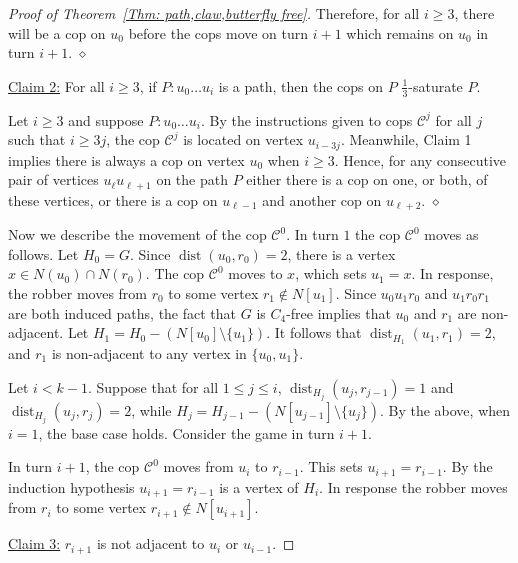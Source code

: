 \documentclass[12pt]{article}
\theoremstyle{definition}
\DeclareMathOperator{\dist}{dist}
\begin{document}
\begin{proof}[Proof of Theorem~\ref{Thm: path,claw,butterfly free}]
Therefore, for all $i\geq 3$, there will be a cop on $u_0$ before the cops move on turn $i+1$ which remains on $u_0$ in turn $i+1$.
\hfill $\diamond$
\vspace{0.5cm}


\vspace{0.25cm}
\noindent\underline{Claim 2:} For all $i\geq 3$, if $P: u_0\dots u_i$ is a path, then the cops on $P$ $\frac{1}{3}$-saturate $P$.
\vspace{0.25cm}

Let $i\geq 3$ and suppose $P: u_0\dots u_i$.
By the instructions given to cops $\mathcal{C}^j$ for all $j$ such that $i\geq 3j$, the cop $\mathcal{C}^j$ is located on vertex $u_{i-3j}$.
Meanwhile, Claim 1 implies there is always a cop on vertex $u_0$ when $i\geq 3$.
Hence, for any consecutive pair of vertices $u_{\ell}u_{\ell+1}$ on the path $P$ either there is a cop on one, or both, of these vertices,
or there is a cop on $u_{\ell-1}$ and another cop on $u_{\ell+2}$.
\hfill $\diamond$
\vspace{0.5cm}


Now we describe the movement of the cop $\mathcal{C}^0$.
In turn $1$ the cop $\mathcal{C}^0$ moves as follows.
Let $H_0 = G$.
Since $\dist(u_0,r_0) = 2$, there is a vertex $x \in N(u_0) \cap N(r_0)$.
The cop $\mathcal{C}^0$ moves to $x$, which sets $u_1 = x$.
In response, the robber moves from $r_0$ to some vertex $r_1 \notin N[u_1]$.
Since $u_0u_1r_0$ and $u_1r_0r_1$ are both induced paths, 
the fact that $G$ is $C_4$-free implies that $u_0$ and $r_1$ are non-adjacent.
Let $H_1 = H_0 - (N[u_0]\setminus \{u_1\})$.
It follows that $\dist_{H_1}(u_1,r_1) = 2$, and $r_1$ is non-adjacent to any vertex in $\{u_0,u_1\}$.


Let $i < k-1$.
Suppose that for all $1 \leq j \leq i$, $\dist_{H_j}(u_j,r_{j-1}) = 1$ and $\dist_{H_j}(u_j,r_{j}) = 2$,
while $H_j = H_{j-1} - (N[u_{j-1}]\setminus \{u_j\})$.
By the above, when $i=1$, the base case holds.
Consider the game in turn $i+1$.


In turn $i+1$,
the cop $\mathcal{C}^0$ moves from $u_i$ to $r_{i-1}$.
This sets $u_{i+1} = r_{i-1}$.
By the induction hypothesis $u_{i+1} = r_{i-1}$ is a vertex of $H_i$.
In response the robber moves from $r_{i}$ to some vertex $r_{i+1} \notin N[u_{i+1}]$.


\vspace{0.25cm}
\noindent\underline{Claim 3:} $r_{i+1}$ is not adjacent to $u_i$ or $u_{i-1}$.
\vspace{0.25cm}


\end{proof}
\end{document}
